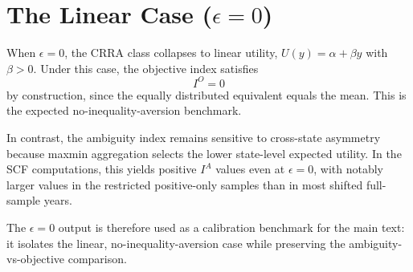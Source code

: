 \documentclass[Chp3.tex]{subfiles}
\begin{document}
\section{The Linear Case ($\epsilon = 0$)}
\label{app:eps0-benchmark}

\par When $\epsilon=0$, the CRRA class collapses to linear utility, $U(y)=\alpha+\beta y$ with $\beta>0$. Under this case, the objective index satisfies
\[
I^{O}=0
\]
by construction, since the equally distributed equivalent equals the mean. This is the expected no-inequality-aversion benchmark.

\par In contrast, the ambiguity index remains sensitive to cross-state asymmetry because maxmin aggregation selects the lower state-level expected utility. In the SCF computations, this yields positive $I^{A}$ values even at $\epsilon=0$, with notably larger values in the restricted positive-only samples than in most shifted full-sample years.

\par The $\epsilon=0$ output is therefore used as a calibration benchmark for the main text: it isolates the linear, no-inequality-aversion case while preserving the ambiguity-vs-objective comparison.
\end{document}
